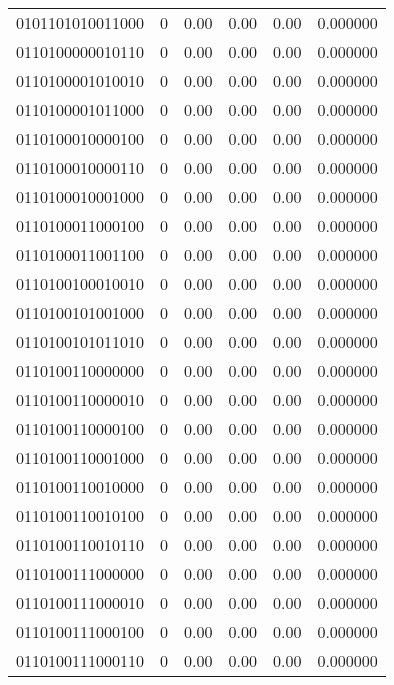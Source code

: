 \begin{tabular}{lrrrrr}
0101101010011000 &         0 &      0.00 &     0.00 &     0.00 &  0.000000 \\
0110100000010110 &         0 &      0.00 &     0.00 &     0.00 &  0.000000 \\
0110100001010010 &         0 &      0.00 &     0.00 &     0.00 &  0.000000 \\
0110100001011000 &         0 &      0.00 &     0.00 &     0.00 &  0.000000 \\
0110100010000100 &         0 &      0.00 &     0.00 &     0.00 &  0.000000 \\
0110100010000110 &         0 &      0.00 &     0.00 &     0.00 &  0.000000 \\
0110100010001000 &         0 &      0.00 &     0.00 &     0.00 &  0.000000 \\
0110100011000100 &         0 &      0.00 &     0.00 &     0.00 &  0.000000 \\
0110100011001100 &         0 &      0.00 &     0.00 &     0.00 &  0.000000 \\
0110100100010010 &         0 &      0.00 &     0.00 &     0.00 &  0.000000 \\
0110100101001000 &         0 &      0.00 &     0.00 &     0.00 &  0.000000 \\
0110100101011010 &         0 &      0.00 &     0.00 &     0.00 &  0.000000 \\
0110100110000000 &         0 &      0.00 &     0.00 &     0.00 &  0.000000 \\
0110100110000010 &         0 &      0.00 &     0.00 &     0.00 &  0.000000 \\
0110100110000100 &         0 &      0.00 &     0.00 &     0.00 &  0.000000 \\
0110100110001000 &         0 &      0.00 &     0.00 &     0.00 &  0.000000 \\
0110100110010000 &         0 &      0.00 &     0.00 &     0.00 &  0.000000 \\
0110100110010100 &         0 &      0.00 &     0.00 &     0.00 &  0.000000 \\
0110100110010110 &         0 &      0.00 &     0.00 &     0.00 &  0.000000 \\
0110100111000000 &         0 &      0.00 &     0.00 &     0.00 &  0.000000 \\
0110100111000010 &         0 &      0.00 &     0.00 &     0.00 &  0.000000 \\
0110100111000100 &         0 &      0.00 &     0.00 &     0.00 &  0.000000 \\
0110100111000110 &         0 &      0.00 &     0.00 &     0.00 &  0.000000 \\

\end{tabular}
